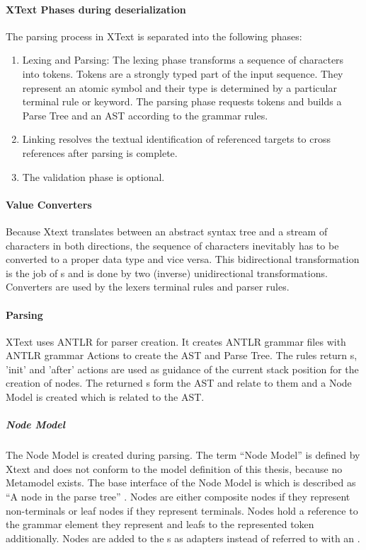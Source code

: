 \paragraph{XText Phases during deserialization}
The parsing process in XText is separated into the following phases:
\begin{enumerate}
	\item Lexing and Parsing: The lexing phase transforms a sequence of characters into tokens. Tokens are a strongly typed part of the input sequence. They represent an atomic symbol and their type is determined by a particular terminal rule or keyword. The parsing phase requests tokens and builds a Parse Tree and an AST according to the grammar rules.
	\item Linking resolves the textual identification of referenced targets to cross references after parsing is complete.
	\item The validation phase is optional.
\end{enumerate}

\paragraph{Value Converters}
Because Xtext translates between an abstract syntax tree and a stream of characters in both directions, the sequence of characters inevitably has to be converted to a proper data type and vice versa. This bidirectional transformation is the job of s and is done by two (inverse) unidirectional transformations. Converters are used by the lexers terminal rules and parser rules.


\paragraph{Parsing}
XText uses ANTLR \cite{ANTLR} for parser creation. It creates ANTLR grammar files with ANTLR grammar Actions to create the AST and Parse Tree. The rules return s, 'init' and 'after' actions are used as guidance of the current stack position for the creation of nodes. The returned s form the AST and relate to them and a Node Model is created which is related to the AST. 

\subparagraph{Node Model}
The Node Model is created during parsing. The term ``Node Model'' is defined by Xtext and does not conform to the model definition of this thesis, because no Metamodel exists. The base interface of the Node Model is  which  is described as ``A node in the parse tree'' \cite{XTextAPI}. Nodes are either composite nodes if they represent non-terminals or leaf nodes if they represent terminals. Nodes hold a reference to the grammar element they represent and leafs to the represented token additionally. Nodes are added to the s as adapters instead of referred to with an .

